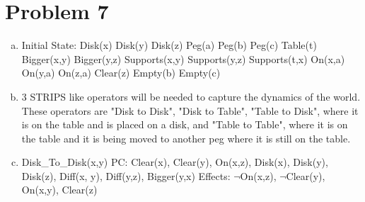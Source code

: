 \documentclass[12pt]{article}%
\begin{document}
\section*{Problem 7}
    \begin{enumerate}[a)]
        \item Initial State:\newline
            Disk(x)\newline
            Disk(y)\newline
            Disk(z)\newline
            Peg(a)\newline
            Peg(b)\newline
            Peg(c)\newline
            Table(t)
            Bigger(x,y)\newline
            Bigger(y,z)\newline
            Supports(x,y)\newline
            Supports(y,z)\newline
            Supports(t,x)
            On(x,a)\newline
            On(y,a)\newline
            On(z,a)\newline
            Clear(z)\newline
            Empty(b)\newline
            Empty(c)\newline
        \item
            3 STRIPS like operators will be needed to capture the dynamics of the world. These operators are "Disk to Disk", "Disk to Table", "Table to Disk", where it is on the table and is placed on a disk, and "Table to Table", where it is on the table and it is being moved to another peg where it is still on the table.
        \item
            Disk\_To\_Disk(x,y)\newline
            PC: Clear(x), Clear(y), On(x,z), Disk(x), Disk(y), 
            Disk(z), Diff(x, y), Diff(y,z), Bigger(y,x)
            \newline
            \newline
            Effects: $\neg$On(x,z), $\neg$Clear(y), On(x,y), Clear(z)
    \end{enumerate}
\end{document}
